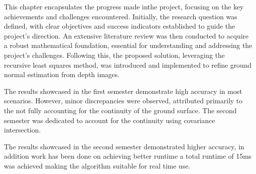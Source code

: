 \documentclass[12pt,a4paper,oneside,onecolumn]{book}
\begin{document}
This chapter encapsulates the progress made inthe project, focusing on the key achievements and challenges encountered. Initially, the research question was defined, with clear objectives and success indicators established to guide the project's direction. An extensive literature review was then conducted to acquire a robust mathematical foundation, essential for understanding and addressing the project's challenges. Following this, the proposed solution, leveraging the recursive least squares method, was introduced and implemented to refine ground normal estimation from depth images.

The results showcased in the first semester demonstrate high accuracy in most scenarios. However, minor discrepancies were observed, attributed primarily to the not fully accounting for the continuity of the ground surface. The second semester was dedicated to account for the continuity using covariance intersection.

The results showcased in the second semester demonstrated higher accuracy, in addition work has been done on achieving better runtime a total runtime of 15ms was achieved making the algorithm suitable for real time use.  





\end{document}
